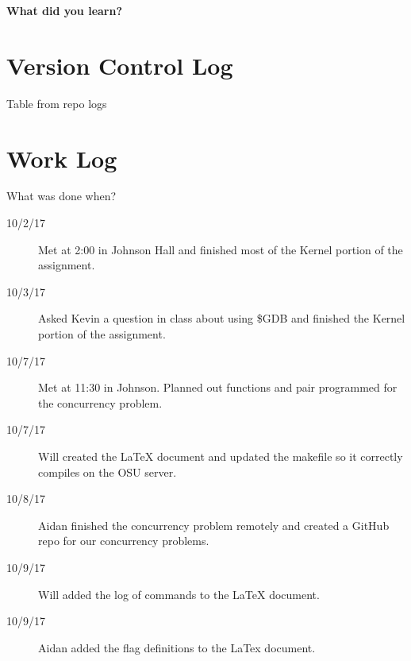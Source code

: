 \documentclass[10pt,letterpaper,draftclsnofoot,onecolumn]{IEEEtran}
\begin{document}
\noindent\textbf{What did you learn?}

\section{Version Control Log}
\noindent Table from repo logs

\section{Work Log}
\noindent What was done when?
\begin{description}
\item [10/2/17] Met at 2:00 in Johnson Hall and finished most of the Kernel portion of the assignment.
\item [10/3/17] Asked Kevin a question in class about using \$GDB and finished the Kernel portion of the assignment. 
\item [10/7/17] Met at 11:30 in Johnson. Planned out functions and pair programmed for the concurrency problem.
\item [10/7/17] Will created the LaTeX document and updated the makefile so it correctly compiles on the OSU server. 
\item [10/8/17] Aidan finished the concurrency problem remotely and created a GitHub repo for our concurrency problems. 
\item [10/9/17] Will added the log of commands to the LaTeX document. 
\item [10/9/17] Aidan added the flag definitions to the LaTex document. 
\end{description}
\end{document}
